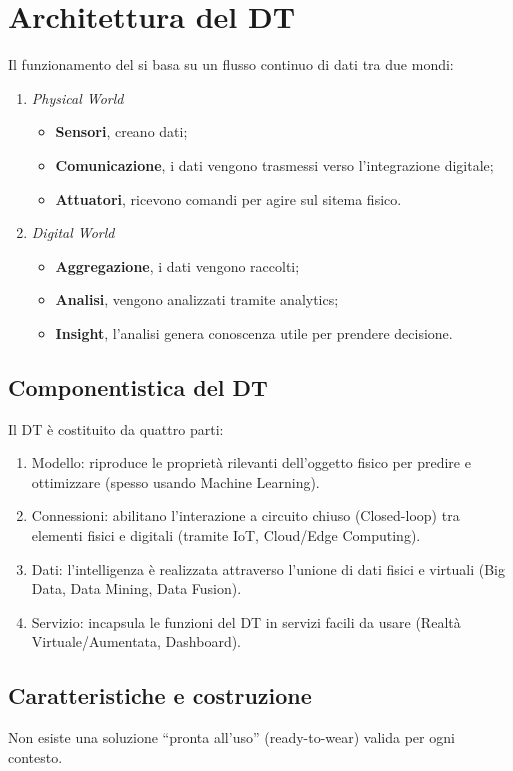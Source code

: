 \section{Architettura del DT}
Il funzionamento del si basa su un flusso continuo di dati tra due mondi:
\begin{enumerate}
    \item \emph{Physical World}
          \begin{itemize}
              \item \textbf{Sensori}, creano dati;
              \item \textbf{Comunicazione}, i dati vengono trasmessi verso l'integrazione digitale;
              \item \textbf{Attuatori}, ricevono comandi per agire sul sitema fisico.
          \end{itemize}
    \item \emph{Digital World}
          \begin{itemize}
              \item \textbf{Aggregazione}, i dati vengono raccolti;
              \item \textbf{Analisi}, vengono analizzati tramite analytics;
              \item \textbf{Insight}, l'analisi genera conoscenza utile per prendere decisione.
          \end{itemize}
\end{enumerate}

%
\subsection{Componentistica del DT}
Il DT è costituito da quattro parti:
\begin{enumerate}
    \item Modello: riproduce le proprietà rilevanti dell'oggetto fisico per predire e ottimizzare (spesso usando Machine Learning).
    \item Connessioni: abilitano l'interazione a circuito chiuso (Closed-loop) tra elementi fisici e digitali (tramite IoT, Cloud/Edge Computing).
    \item Dati: l'intelligenza è realizzata attraverso l'unione di dati fisici e virtuali (Big Data, Data Mining, Data Fusion).
    \item Servizio: incapsula le funzioni del DT in servizi facili da usare (Realtà Virtuale/Aumentata, Dashboard).
\end{enumerate}
%
\subsection{Caratteristiche e costruzione}
Non esiste una soluzione ``pronta all'uso'' (ready-to-wear) valida per ogni contesto.
